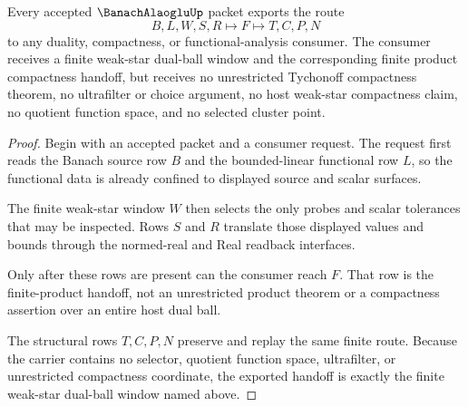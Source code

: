 \begin{theorem}
\label{thm:banach-alaoglu-finite-dual-ball-handoff}
Every accepted $\BanachAlaogluUp$ packet exports the route
$$
B,L,W,S,R \longmapsto F \longmapsto T,C,P,N
$$
to any duality, compactness, or functional-analysis consumer. The consumer receives a finite weak-star dual-ball window and the corresponding finite product compactness handoff, but receives no unrestricted Tychonoff compactness theorem, no ultrafilter or choice argument, no host weak-star compactness claim, no quotient function space, and no selected cluster point.
\end{theorem}
\begin{proof}
Begin with an accepted packet and a consumer request. The request first reads the Banach source row $B$ and the bounded-linear functional row $L$, so the functional data is already confined to displayed source and scalar surfaces.

The finite weak-star window $W$ then selects the only probes and scalar tolerances that may be inspected. Rows $S$ and $R$ translate those displayed values and bounds through the normed-real and Real readback interfaces.

Only after these rows are present can the consumer reach $F$. That row is the finite-product handoff, not an unrestricted product theorem or a compactness assertion over an entire host dual ball.

The structural rows $T,C,P,N$ preserve and replay the same finite route. Because the carrier contains no selector, quotient function space, ultrafilter, or unrestricted compactness coordinate, the exported handoff is exactly the finite weak-star dual-ball window named above.
\end{proof}


\begin{closurestatus}{\BanachAlaogluUp}
  \theoryclosure{\seedClosure}
  \formalstatus{\unformalizedV}
\end{closurestatus}
